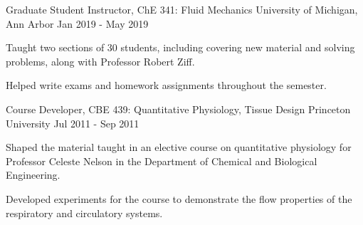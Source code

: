 \begin{cventries}
  \cventry
    {Graduate Student Instructor, ChE 341: Fluid Mechanics} %
    {University of Michigan, Ann Arbor} %
    {} %
    {Jan 2019 - May 2019} %
{
      \begin{cvitems} %
        \item Taught two sections of 30 students, including covering new material and solving problems, along with Professor Robert Ziff.
        \item Helped write exams and homework assignments throughout the semester.
      \end{cvitems}
    }
  \cventry
    {Course Developer, CBE 439: Quantitative Physiology, Tissue Design} %
    {Princeton University} %
    {} %
    {Jul 2011 - Sep 2011} %
{
      \begin{cvitems} %
        \item Shaped the material taught in an elective course on quantitative physiology for Professor Celeste Nelson in the Department of Chemical and Biological Engineering.
        \item Developed experiments for the course to demonstrate the flow properties of the respiratory and circulatory systems.
      \end{cvitems}
    }
\end{cventries}